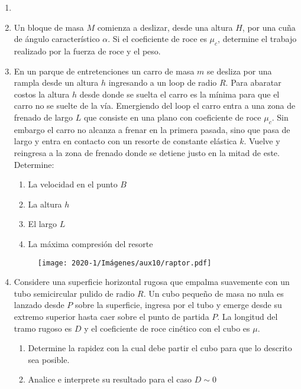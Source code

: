 \documentclass[letterpaper,11pt]{article}
\begin{document}
\vspace{-1cm}
\begin{enumerate}\setlength{\itemsep}{0.4cm}


\item[]

\item Un bloque de masa $M$ comienza a deslizar, desde una altura $H$, por una cuña de ángulo característico $\alpha$. Si el coeficiente de roce es $\mu_c$, determine el trabajo realizado por la fuerza de roce y el peso.

\begin{figure}[H]
    \centering
    
\end{figure}

\item En un parque de entretenciones un carro de masa $m$ se desliza por una rampla desde un altura $h$ ingresando a un loop de radio $R$. Para abaratar costos la altura $h$ desde donde se suelta el carro es la mínima para que el carro no se suelte de la vía. Emergiendo del loop el carro entra a una zona de frenado de largo $L$ que consiste en una plano con coeficiente de roce $\mu_c$. Sin embargo el carro no alcanza a frenar en la primera pasada, sino que pasa de largo y entra en contacto con un resorte de constante elástica $k$. Vuelve y reingresa a la zona de frenado donde se detiene justo en la mitad de este. Determine:

\begin{enumerate}
    \item La velocidad en el punto $B$
    \item La altura $h$
    \item El largo $L$
    \item La máxima compresión del resorte
\end{enumerate}

\begin{figure}[h!]
    \centering
    \texttt{[image: 2020-1/Imágenes/aux10/raptor.pdf]}
\end{figure}

\item Considere una superficie horizontal rugosa que empalma suavemente con un tubo semicircular pulido de radio $R$. Un cubo pequeño de masa no nula es lanzado desde $P$ sobre la superficie, ingresa por el tubo y emerge desde su extremo superior hasta caer sobre el punto de partida $P$. La longitud del tramo rugoso es $D$ y el coeficiente de roce cinético con el cubo es $\mu$.
    \begin{enumerate}
        \item Determine la rapidez con la cual debe partir el cubo para que lo descrito sea posible.
        \item Analice e interprete su resultado para el caso $D \sim 0$
    \end{enumerate}


\end{enumerate}
\end{document}
